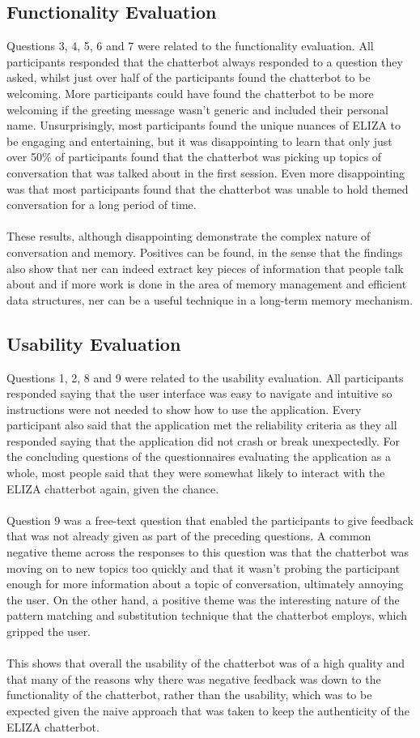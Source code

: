 \subsection{Functionality Evaluation}
Questions 3, 4, 5, 6 and 7 were related to the functionality evaluation. All participants responded that the chatterbot always responded to a question they asked, whilst just over half of the participants found the chatterbot to be welcoming. More participants could have found the chatterbot to be more welcoming if the greeting message wasn't generic and included their personal name. Unsurprisingly, most participants found the unique nuances of ELIZA to be engaging and entertaining, but it was disappointing to learn that only just over 50\% of participants found that the chatterbot was picking up topics of conversation that was talked about in the first session. Even more disappointing was that most participants found that the chatterbot was unable to hold themed conversation for a long period of time. \\\\
These results, although disappointing demonstrate the complex nature of conversation and memory. Positives can be found, in the sense that the findings also show that \gls{ner} can indeed extract key pieces of information that people talk about and if more work is done in the area of memory management and efficient data structures, \gls{ner} can be a useful technique in a long-term memory mechanism.
\subsection{Usability Evaluation}
Questions 1, 2, 8 and 9 were related to the usability evaluation. All participants responded saying that the user interface was easy to navigate and intuitive so instructions were not needed to show how to use the application. Every participant also said that the application met the reliability criteria as they all responded saying that the application did not crash or break unexpectedly. For the concluding questions of the questionnaires evaluating the application as a whole, most people said that they were somewhat likely to interact with the ELIZA chatterbot again, given the chance.\\\\
Question 9 was a free-text question that enabled the participants to give feedback that was not already given as part of the preceding questions. A common negative theme across the responses to this question was that the chatterbot was moving on to new topics too quickly and that it wasn't probing the participant enough for more information about a topic of conversation, ultimately annoying the user. On the other hand, a positive theme was the interesting nature of the pattern matching and substitution technique that the chatterbot employs, which gripped the user.\\\\
This shows that overall the usability of the chatterbot was of a high quality and that many of the reasons why there was negative feedback was down to the functionality of the chatterbot, rather than the usability, which was to be expected given the naive approach that was taken to keep the authenticity of the ELIZA chatterbot.
